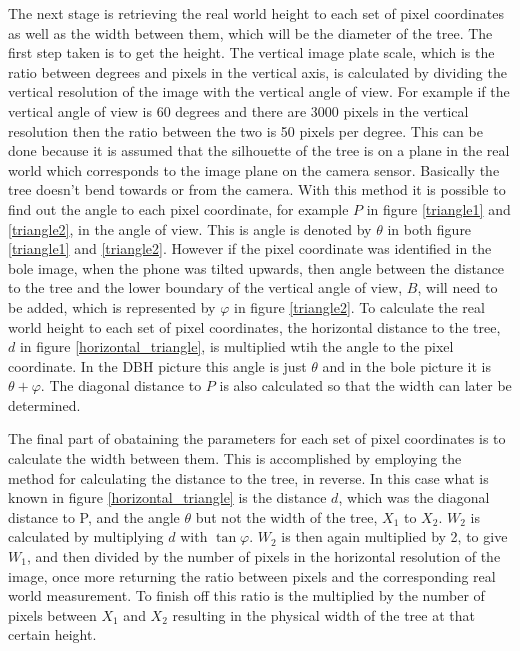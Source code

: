 The next stage is retrieving the real world height to each set of pixel coordinates as well as the width between them, which will be the diameter of the tree. The first step taken is to get the height. The vertical image plate scale, which is the ratio between degrees and pixels in the vertical axis, is calculated by dividing the vertical resolution of the image with the vertical angle of view. For example if the vertical angle of view is 60 degrees and there are 3000 pixels in the vertical resolution then the ratio between the two is 50 pixels per degree. This can be done because it is assumed that the silhouette of the tree is on a plane in the real world which corresponds to the image plane on the camera sensor. Basically the tree doesn't bend towards or from the camera. With this method it is possible to find out the angle to each pixel coordinate, for example $P$ in figure \ref{triangle1} and \ref{triangle2}, in the angle of view. This is angle is denoted by $\theta$ in both figure \ref{triangle1} and \ref{triangle2}. However if the pixel coordinate was identified in the bole image, when the phone was tilted upwards, then angle between the distance to the tree and the lower boundary of the vertical angle of view, $B$, will need to be added, which is represented by $\varphi$ in figure \ref{triangle2}. To calculate the real world height to each set of pixel coordinates, the horizontal distance to the tree, $d$ in figure \ref{horizontal_triangle}, is multiplied wtih the angle to the pixel coordinate. In the DBH picture this angle is just $\theta$ and in the bole picture it is $\theta + \varphi$. The diagonal distance to $P$ is also calculated so that the width can later be determined.

The final part of obataining the parameters for each set of pixel coordinates is to calculate the width between them. This is accomplished by employing the method for calculating the distance to the tree, in reverse. In this case what is known in figure \ref{horizontal_triangle} is the distance $d$, which was the diagonal distance to P, and the angle $\theta$ but not the width of the tree, $X_1$ to $X_2$. $W_2$ is calculated by multiplying $d$ with $\tan{\varphi}$. $W_2$ is then again multiplied by 2, to give $W_1$, and then divided by the number of pixels in the horizontal resolution of the image, once more returning the ratio between pixels and the corresponding real world measurement. To finish off this ratio is the multiplied by the number of pixels between $X_1$ and $X_2$ resulting in the physical width of the tree at that certain height.


